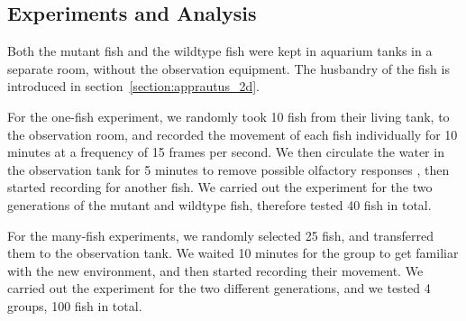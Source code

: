 \documentclass[11pt,twoside]{report}
\begin{document}
\subsection{Experiments and Analysis}

Both the mutant fish and the wildtype fish were kept in aquarium tanks in a separate room, without the observation equipment. The husbandry of the fish is introduced in section~\ref{section:apprautus_2d}.

For the one-fish experiment, we randomly took 10 fish from their living tank, to the observation room, and recorded the movement of each fish individually for 10 minutes at a frequency of 15 frames per second. We then circulate the water in the observation tank for 5 minutes to remove possible olfactory responses \cite{kalueff2013}, then started recording for another fish. We carried out the experiment for the two generations of the mutant and wildtype fish, therefore tested 40 fish in total.


For the many-fish experiments, we randomly selected 25 fish, and transferred them to the observation tank. We waited 10 minutes for the group to get familiar with the new environment, and then started recording their movement. We carried out the experiment for the two different generations, and we tested 4 groups, 100 fish in total.
\end{document}
